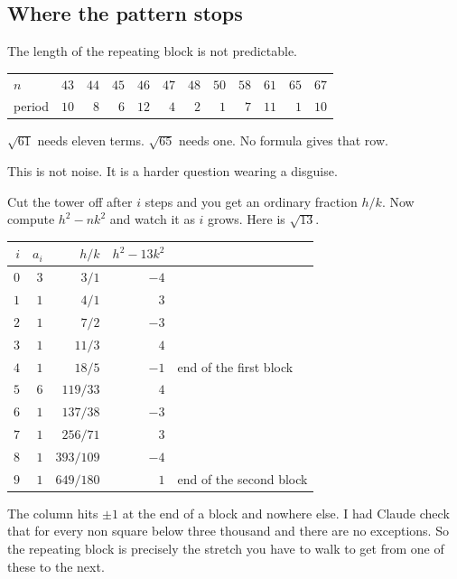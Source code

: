 \documentclass[11pt,a4paper]{article}
\theoremstyle{definition}
\theoremstyle{plain}
\begin{document}
\subsection{Where the pattern stops}

The length of the repeating block is not predictable.

\begin{center}
\begin{tabular}{lrrrrrrrrrrr}
\toprule
$n$      & $43$ & $44$ & $45$ & $46$ & $47$ & $48$ & $50$ & $58$ & $61$ & $65$ & $67$ \\
period   & $10$ & $8$  & $6$  & $12$ & $4$  & $2$  & $1$  & $7$  & $11$ & $1$  & $10$ \\
\bottomrule
\end{tabular}
\end{center}

$\sqrt{61}$ needs eleven terms. $\sqrt{65}$ needs one. No formula gives that row.

This is not noise. It is a harder question wearing a disguise.

Cut the tower off after $i$ steps and you get an ordinary fraction $h/k$. Now
compute $h^2 - n k^2$ and watch it as $i$ grows. Here is $\sqrt{13}$.

\begin{center}
\begin{tabular}{rrrrl}
\toprule
$i$ & $a_i$ & $h/k$ & $h^2 - 13k^2$ & \\
\midrule
$0$ & $3$ & $3/1$     & $-4$ & \\
$1$ & $1$ & $4/1$     & $3$  & \\
$2$ & $1$ & $7/2$     & $-3$ & \\
$3$ & $1$ & $11/3$    & $4$  & \\
$4$ & $1$ & $18/5$    & $-1$ & end of the first block \\
$5$ & $6$ & $119/33$  & $4$  & \\
$6$ & $1$ & $137/38$  & $-3$ & \\
$7$ & $1$ & $256/71$  & $3$  & \\
$8$ & $1$ & $393/109$ & $-4$ & \\
$9$ & $1$ & $649/180$ & $1$  & end of the second block \\
\bottomrule
\end{tabular}
\end{center}

The column hits $\pm 1$ at the end of a block and nowhere else. I had Claude
check that for every non square below three thousand and there are no
exceptions. So the repeating block is precisely the stretch you have to walk to
get from one of these to the next.
\end{document}
